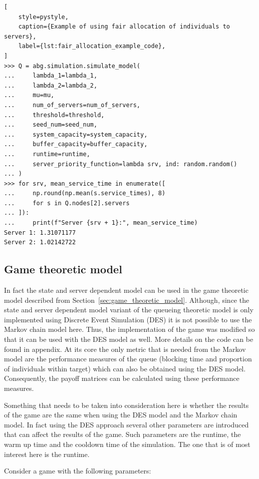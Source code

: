 \begin{lstlisting}[
    style=pystyle,
    caption={Example of using fair allocation of individuals to servers},
    label={lst:fair_allocation_example_code},
]
>>> Q = abg.simulation.simulate_model(
...     lambda_1=lambda_1,
...     lambda_2=lambda_2,
...     mu=mu,
...     num_of_servers=num_of_servers,
...     threshold=threshold,
...     seed_num=seed_num,
...     system_capacity=system_capacity,
...     buffer_capacity=buffer_capacity,
...     runtime=runtime,
...     server_priority_function=lambda srv, ind: random.random()
... )
>>> for srv, mean_service_time in enumerate([
...     np.round(np.mean(s.service_times), 8)
...     for s in Q.nodes[2].servers
... ]):
...     print(f"Server {srv + 1}:", mean_service_time)
Server 1: 1.31071177
Server 2: 1.02142722

\end{lstlisting}


\subsection{Game theoretic model}

In fact the state and server dependent model can be used in the game theoretic
model described from Section~\ref{sec:game_theoretic_model}.
Although, since the state and server dependent model variant of the queueing
theoretic model is only implemented using Discrete Event Simulation (DES) it is
not possible to use the Markov chain model here.
Thus, the implementation of the game was modified so that it can be used with
the DES model as well.
More details on the code can be found in appendix.
At its core the only metric that is needed from the Markov model are the
performance measures of the queue (blocking time and proportion of individuals
within target) which can also be obtained using the DES model.
Consequently, the payoff matrices can be calculated using these performance
measures.

Something that needs to be taken into consideration here is whether the results
of the game are the same when using the DES model and the Markov chain model.
In fact using the DES approach several other parameters are introduced that
can affect the results of the game.
Such parameters are the runtime, the warm up time and the cooldown time of the
simulation.
The one that is of most interest here is the runtime.

Consider a game with the following parameters:

